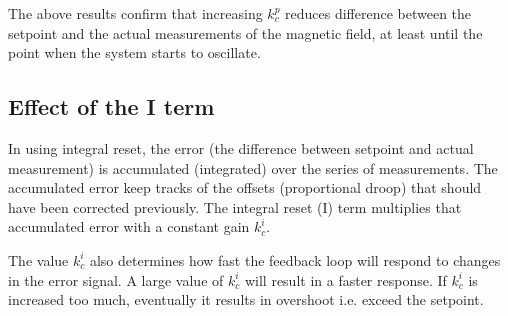 %
The above results confirm that increasing $k_c^p$ reduces difference
between the setpoint and the actual measurements of the magnetic
field, at least until the point when the system starts to oscillate.

\subsection{Effect of the I term}

In using integral reset, the error (the difference between setpoint
and actual measurement) is accumulated (integrated) over the series of
measurements.  The accumulated error keep tracks of the offsets
(proportional droop) that should have been corrected previously.  The
integral reset (I) term multiplies that accumulated error with a
constant gain $k_c^i$.

The value $k_c^i$ also determines how fast the feedback loop will
respond to changes in the error signal.  A large value of $k_c^i$ will
result in a faster response.  If $k_c^i$ is increased too much,
eventually it results in overshoot i.e. exceed the setpoint.



